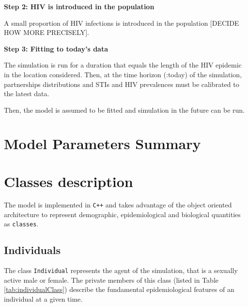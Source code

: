 \documentclass[11pt, onecolumn]{article}
\newcommand{\ttt}[1]{\texttt{#1}}
\begin{document}
\textbf{Step 2: HIV is introduced in the population}

A small proportion of HIV infections is introduced in the population [DECIDE HOW MORE PRECISELY].

\textbf{Step 3: Fitting to today's data}

The simulation is run for a duration that equals the length of the HIV epidemic in the location considered. Then, at the time horizon (:today) of the simulation, partnerships distributions and STIs and HIV prevalences must be calibrated to the latest data.

Then, the model is assumed to be fitted and simulation in the future can be run.


\section{Model Parameters Summary}

\section{Classes description}

The model is implemented in \ttt{C++} and takes advantage of the object oriented architecture to represent demographic, epidemiological and biological quantities as \ttt{classes}. 


\subsection{Individuals}

The class \ttt{Individual} represents the agent of the simulation, that is a sexually active male or female. The private members of this class (listed in Table \ref{tab:individualClass}) describe the fundamental epidemiological features of an individual at a given time.
\end{document}
